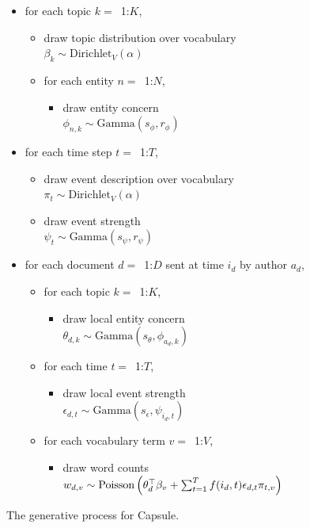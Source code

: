 \begin{figure}

\begin{mdframed}
\small
\begin{itemize}[leftmargin=*]
\item for each topic $k=$~1:$K$,
	\begin{itemize}[leftmargin=*]
	\item draw topic distribution over vocabulary \\$\beta_k \sim \mbox{Dirichlet}_V (\alpha)$
	\item for each entity $n=$~1:$N$,
		\begin{itemize}[leftmargin=*]
		\item draw entity concern \\$\phi_{n,k} \sim \mbox{Gamma}(s_\phi, r_\phi)$
		\end{itemize}
	\end{itemize}
\item for each time step $t=$~1:$T$,
	\begin{itemize}[leftmargin=*]
	\item draw event description over vocabulary \\$\pi_t \sim \mbox{Dirichlet}_V (\alpha)$
	\item draw event strength \\$\psi_{t} \sim \mbox{Gamma}(s_\psi, r_\psi)$
	\end{itemize}
\item for each document $d=$~1:$D$ sent at time $i_d$ by author $a_d$,
	\begin{itemize}[leftmargin=*]
		\item for each topic $k=$~1:$K$,
		\begin{itemize}[leftmargin=*]
			\item draw local entity concern \\$\theta_{d,k} \sim \mbox{Gamma}(s_\theta, \phi_{a_d,k})$
		\end{itemize}
	\item for each time $t=$~1:$T$,
		\begin{itemize}[leftmargin=*]
			\item draw local event strength \\$\epsilon_{d,t} \sim \mbox{Gamma}(s_\epsilon, \psi_{i_d,t})$ 
		\end{itemize}
	\item for each vocabulary term $v=$~1:$V$,
		\begin{itemize}[leftmargin=*]
			\item draw word counts $w_{d,v} \sim\\ \mbox{Poisson}\left(\theta_d^\top\beta_v + \sum_{t=1}^T f(i_d, t) \epsilon_{d,t} \pi_{t,v}\right)$
		\end{itemize}
	\end{itemize}
\end{itemize}
\end{mdframed}

\caption{The generative process for Capsule.}
\label{fig:generative-model}
\end{figure}


